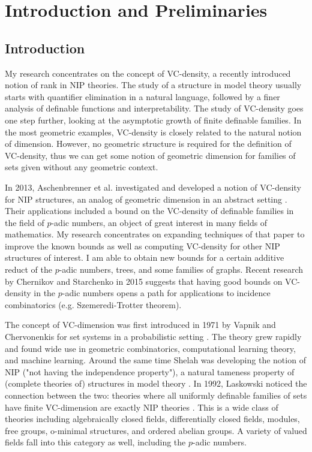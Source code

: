 \chapter{Introduction and Preliminaries}

\section{Introduction}
My research concentrates on the concept of VC-density, a recently introduced notion of rank in NIP theories.
The study of a structure in model theory usually starts with quantifier elimination in a natural language, followed by a finer analysis of definable functions and interpretability.
The study of VC-density goes one step further, looking at the asymptotic growth of finite definable families.
In the most geometric examples, VC-density is closely related to the natural notion of dimension.
However, no geometric structure is required for the definition of VC-density, thus we can get some notion of geometric dimension for families of sets given without any geometric context.

In 2013, Aschenbrenner et al. investigated and developed a notion of VC-density for NIP structures, an analog of geometric dimension in an abstract setting \cite{density}. Their applications included a bound on the VC-density of definable families in the field of $p$-adic numbers, an object of great interest in many fields of mathematics. My research concentrates on expanding techniques of that paper to improve the known bounds as well as computing VC-density for other NIP structures of interest. I am able to obtain new bounds for a certain additive reduct of the $p$-adic numbers, trees, and some families of graphs. Recent research by Chernikov and Starchenko in 2015 \cite{regularity} suggests that having good bounds on VC-density in the $p$-adic numbers opens a path for applications to incidence combinatorics (e.g. Szemeredi-Trotter theorem).

The concept of VC-dimension was first introduced in 1971 by Vapnik and Chervonenkis for set systems in a probabilistic setting \cite{vc71}.
The theory grew rapidly and found wide use in geometric combinatorics, computational learning theory, and machine learning.
Around the same time Shelah was developing the notion of NIP ("not having the independence property"),
a natural tameness property of (complete theories of) structures in model theory \cite{shelah_nip}.
In 1992, Laskowski noticed the connection between the two: theories where all uniformly definable families of sets have finite VC-dimension are exactly NIP theories \cite{laskowski92}.
This is a wide class of theories including algebraically closed fields, differentially closed fields, modules, free groups, o-minimal structures, and ordered abelian groups.
A variety of valued fields fall into this category as well, including the $p$-adic numbers.


